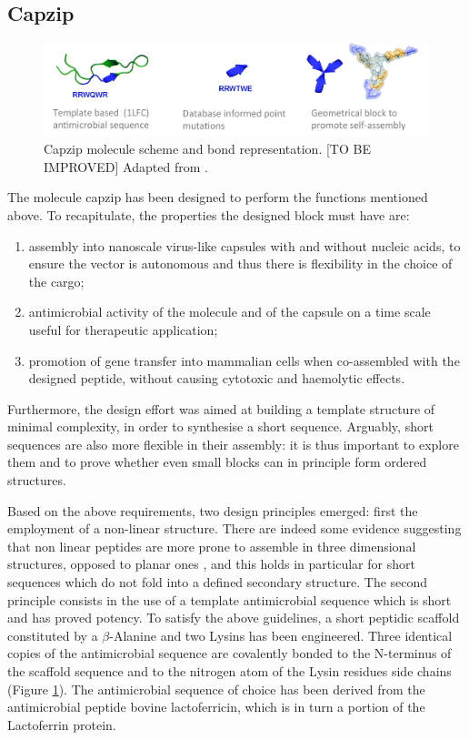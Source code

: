 \subsection{Capzip} \label{sec:capzip}

\begin{figure}
\begin{center}
\includegraphics[width = \textwidth]{pics/capzip.png}
\caption[Cazip molecule]{Capzip molecule scheme and bond representation. [TO BE IMPROVED] Adapted from \cite{Castelletto2016}.} \label{fig:capzip}
\end{center}
\end{figure}

The molecule capzip has been designed to perform the functions mentioned above. To recapitulate, the properties the designed block must have are:
\begin{enumerate}
\item assembly into nanoscale virus-like capsules with and without nucleic acids, to ensure the vector is autonomous and thus there is flexibility in the choice of the cargo;
\item antimicrobial activity of the molecule and of the capsule on a time scale useful for therapeutic application;
\item promotion of gene transfer into mammalian cells when co-assembled with the designed peptide, without causing cytotoxic and haemolytic effects.
\end{enumerate}
%
Furthermore, the design effort was aimed at building a template structure of minimal complexity, in order to synthesise a short sequence. Arguably, short sequences are also more flexible in their assembly: it is thus important to explore them and to prove whether even small blocks can in principle form ordered structures.

Based on the above requirements, two design principles emerged: first the employment of a non-linear structure. There are indeed some evidence suggesting that non linear peptides are more prone to assemble in three dimensional structures, opposed to planar ones \cite{???}, and this holds in particular for short sequences which do not fold into a defined secondary structure.
%
The second principle consists in the use of a template antimicrobial sequence which is short and has proved potency.
%
To satisfy the above guidelines, a short peptidic scaffold constituted by a $\beta$-Alanine and two Lysins has been engineered.
%
Three identical copies of the antimicrobial sequence are covalently bonded to the N-terminus of the scaffold sequence and to the nitrogen atom of the Lysin residues side chains (Figure \ref{fig:capzip}).
%
The antimicrobial sequence of choice has been derived from the antimicrobial peptide bovine lactoferricin, which is in turn a portion of the Lactoferrin protein.

